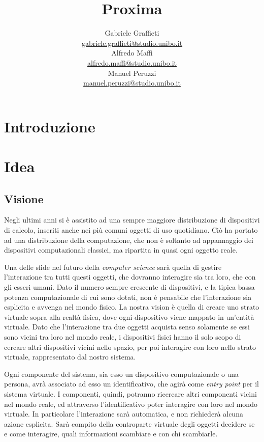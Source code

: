 \documentclass[a4paper,12pt]{report}
\title{\Huge \textbf{Proxima} \\
	\vspace{10pt}
	\vspace{20pt}
}
\author{
	Gabriele Graffieti \\ \small \url{gabriele.graffieti@studio.unibo.it}
	\vspace{15pt}
	\\
	Alfredo Maffi \\ \small \url{alfredo.maffi@studio.unibo.it}
	\vspace{15pt}
	\\
	Manuel Peruzzi \\ \small \url{manuel.peruzzi@studio.unibo.it}
}
\date{}
\begin{document}
\maketitle
{}


\tableofcontents

\chapter{Introduzione}

\chapter{Idea}
\section{Visione} \label{vision}
Negli ultimi anni si è assistito ad una sempre maggiore distribuzione di dispositivi di calcolo, inseriti anche nei più comuni oggetti di uso quotidiano. Ciò ha portato ad una distribuzione della computazione, che non è soltanto ad appannaggio dei dispositivi computazionali classici, ma ripartita in quasi ogni oggetto reale. 

Una delle sfide nel futuro della \emph{computer science} sarà quella di gestire l'interazione tra tutti questi oggetti, che dovranno interagire sia tra loro, che con gli esseri umani. Dato il numero sempre crescente di dispositivi, e la tipica bassa potenza computazionale di cui sono dotati, non è pensabile che l'interazione sia esplicita e avvenga nel mondo fisico. La nostra vision è quella di creare uno strato virtuale sopra alla realtà fisica, dove ogni dispositivo viene mappato in un'entità virtuale. Dato che l'interazione tra due oggetti acquista senso solamente se essi sono vicini tra loro nel mondo reale, i dispositivi fisici hanno il solo scopo di cercare altri dispositivi vicini nello spazio, per poi interagire con loro nello strato virtuale, rappresentato dal nostro sistema. 

Ogni componente del sistema, sia esso un dispositivo computazionale o una persona, avrà associato ad esso un identificativo, che agirà come \emph{entry point} per il sistema virtuale. I componenti, quindi, potranno ricercare altri componenti vicini nel mondo reale, ed attraverso l'identificativo poter interagire con loro nel mondo virtuale. In particolare l'interazione sarà automatica, e non richiederà alcuna azione esplicita. Sarà compito della controparte virtuale degli oggetti decidere se e come interagire, quali informazioni scambiare e con chi scambiarle.
\end{document}

